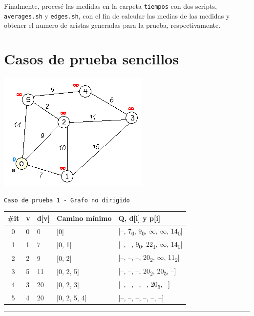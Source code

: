 \documentclass[12pt , a4paper]{article}
\begin{document}
	Finalmente, procesé las medidas en la carpeta \texttt{tiempos} con dos scripts, \texttt{averages.sh} y \texttt{edges.sh}, con el fin de calcular las medias de las medidas y obtener el numero de aristas generadas para la prueba, respectivamente.

\newpage
\section{Casos de prueba sencillos}
\begin{center}
	
	\includegraphics[width=0.4\hsize]{prueba1.png}
	
	\texttt{Caso de prueba 1 - Grafo no dirigido}
	\newline
	
	\begin{tabular}{c|*{3}{l|}l}
		
		\#it	& v & d[v] & Camino mínimo & Q, d[i] y p[i] \\[0.1cm]
		\hline
		0 		& 0 & 0    & [0]           & [--, 7\textsubscript{0}, 9\textsubscript{0}, $\infty$, $\infty$, 14\textsubscript{0}]\\[0.07cm]
		1 		& 1 & 7    & [0, 1]        & [--, --, 9\textsubscript{0}, 22\textsubscript{1}, $\infty$, 14\textsubscript{0}]\\[0.07cm]
		2 		& 2 & 9    & [0, 2]        & [--, --, --, 20\textsubscript{2}, $\infty$, 11\textsubscript{2}]\\[0.07cm]
		3 		& 5 & 11   & [0, 2, 5]     & [--, --, --, 20\textsubscript{2}, 20\textsubscript{5}, --]\\[0.07cm]
		4 		& 3 & 20   & [0, 2, 3]     & [--, --, --, --, 20\textsubscript{5}, --]\\[0.07cm]
		5 		& 4 & 20   & [0, 2, 5, 4]  & [--, --, --, --, --, --]\\[0.07cm]
	\end{tabular}
	
	
	\vspace*{0.03\vsize}
	\par\noindent\rule{\textwidth}{1pt}


\end{center}
\end{document}
